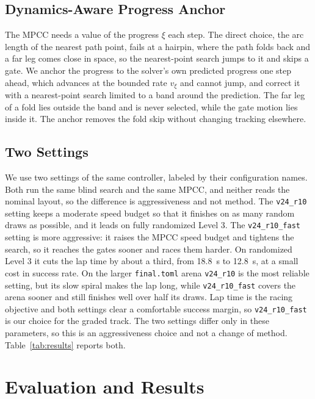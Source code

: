 \documentclass[conference]{IEEEtran}
\begin{document}
\subsection{Dynamics-Aware Progress Anchor}
\label{sec:anchor}
The MPCC needs a value of the progress $\xi$ each step. The direct choice, the arc length of the nearest path point, fails at a hairpin, where the path folds back and a far leg comes close in space, so the nearest-point search jumps to it and skips a gate. We anchor the progress to the solver's own predicted progress one step ahead, which advances at the bounded rate $v_\xi$ and cannot jump, and correct it with a nearest-point search limited to a band around the prediction. The far leg of a fold lies outside the band and is never selected, while the gate motion lies inside it. The anchor removes the fold skip without changing tracking elsewhere.

\subsection{Two Settings}
\label{sec:settings}
We use two settings of the same controller, labeled by their configuration names. Both run the same blind search and the same MPCC, and neither reads the nominal layout, so the difference is aggressiveness and not method. The \texttt{v24\_r10} setting keeps a moderate speed budget so that it finishes on as many random draws as possible, and it leads on fully randomized Level 3. The \texttt{v24\_r10\_fast} setting is more aggressive: it raises the MPCC speed budget and tightens the search, so it reaches the gates sooner and races them harder. On randomized Level 3 it cuts the lap time by about a third, from 18.8~s to 12.8~s, at a small cost in success rate. On the larger \texttt{final.toml} arena \texttt{v24\_r10} is the most reliable setting, but its slow spiral makes the lap long, while \texttt{v24\_r10\_fast} covers the arena sooner and still finishes well over half its draws. Lap time is the racing objective and both settings clear a comfortable success margin, so \texttt{v24\_r10\_fast} is our choice for the graded track. The two settings differ only in these parameters, so this is an aggressiveness choice and not a change of method. Table~\ref{tab:results} reports both.

\section{Evaluation and Results}
\label{sec:results}
\end{document}
